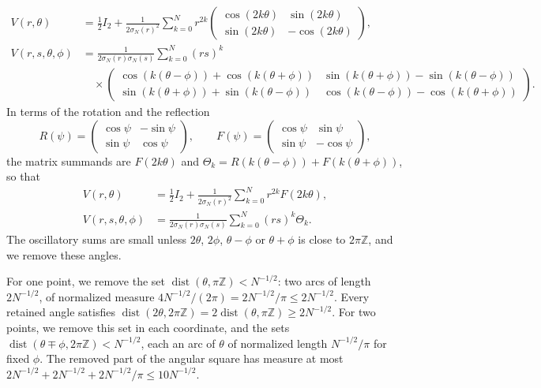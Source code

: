 \begin{align*}
 V(r,\theta)&=\frac12I_2+\frac1{2\sigma_N(r)^2}\sum_{k=0}^Nr^{2k}
 \begin{pmatrix}
 \cos(2k\theta)&\sin(2k\theta)\\
 \sin(2k\theta)&-\cos(2k\theta)
 \end{pmatrix},\\
 V(r,s,\theta,\phi)&=\frac1{2\sigma_N(r)\sigma_N(s)}\sum_{k=0}^N(rs)^k\\
 &\quad\times
 \begin{pmatrix}
 \cos(k(\theta-\phi))+\cos(k(\theta+\phi))&
 \sin(k(\theta+\phi))-\sin(k(\theta-\phi))\\
 \sin(k(\theta+\phi))+\sin(k(\theta-\phi))&
 \cos(k(\theta-\phi))-\cos(k(\theta+\phi))
 \end{pmatrix}.
\end{align*}
In terms of the rotation and the reflection
\begin{equation}
 R(\psi)=\begin{pmatrix}\cos\psi&-\sin\psi\\ \sin\psi&\cos\psi\end{pmatrix},
 \qquad
 F(\psi)=\begin{pmatrix}\cos\psi&\sin\psi\\ \sin\psi&-\cos\psi\end{pmatrix},
 \label{eq:rotation-reflection}
\end{equation}
the matrix summands are $F(2k\theta)$ and
$\Theta_k=R(k(\theta-\phi))+F(k(\theta+\phi))$, so that
\begin{align*}
 V(r,\theta)&=\frac12I_2+\frac1{2\sigma_N(r)^2}\sum_{k=0}^Nr^{2k}F(2k\theta),\\
 V(r,s,\theta,\phi)&=\frac1{2\sigma_N(r)\sigma_N(s)}\sum_{k=0}^N(rs)^k\Theta_k.
\end{align*}
The oscillatory sums are small unless $2\theta$, $2\phi$, $\theta-\phi$ or
$\theta+\phi$ is close to $2\pi\mathbb Z$, and we remove these angles.

For one point, we remove the set
$\operatorname{dist}(\theta,\pi\mathbb Z)<N^{-1/2}$: two arcs of length
$2N^{-1/2}$, of normalized measure
$4N^{-1/2}/(2\pi)=2N^{-1/2}/\pi\le2N^{-1/2}$. Every retained angle
satisfies
$\operatorname{dist}(2\theta,2\pi\mathbb Z)=2\operatorname{dist}(\theta,\pi\mathbb Z)\ge2N^{-1/2}$.
For two points, we remove this set in each coordinate, and the sets
$\operatorname{dist}(\theta\mp\phi,2\pi\mathbb Z)<N^{-1/2}$, each an arc of
$\theta$ of normalized length $N^{-1/2}/\pi$ for fixed $\phi$. The removed
part of the angular square has measure at most
$2N^{-1/2}+2N^{-1/2}+2N^{-1/2}/\pi\le10N^{-1/2}$.

